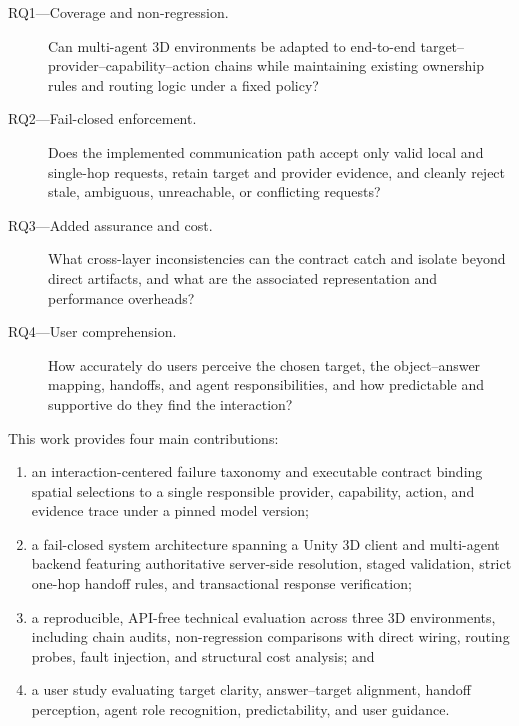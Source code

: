 \begin{description}
\item[RQ1---Coverage and non-regression.] Can multi-agent 3D environments
be adapted to end-to-end target--provider--capability--action chains while
maintaining existing ownership rules and routing logic under a fixed policy?

\item[RQ2---Fail-closed enforcement.] Does the implemented communication path
accept only valid local and single-hop requests, retain target and provider
evidence, and cleanly reject stale, ambiguous, unreachable, or conflicting
requests?

\item[RQ3---Added assurance and cost.] What cross-layer inconsistencies
can the contract catch and isolate beyond direct artifacts, and what are the
associated representation and performance overheads?

\item[RQ4---User comprehension.] How accurately do users perceive the chosen
target, the object--answer mapping, handoffs, and agent responsibilities, and
how predictable and supportive do they find the interaction?
\end{description}

This work provides four main contributions:

\begin{enumerate}
\item an interaction-centered failure taxonomy and executable contract binding
spatial selections to a single responsible provider, capability, action, and
evidence trace under a pinned model version;

\item a fail-closed system architecture spanning a Unity 3D client and
multi-agent backend featuring authoritative server-side resolution, staged
validation, strict one-hop handoff rules, and transactional response
verification;

\item a reproducible, API-free technical evaluation across three 3D
environments, including chain audits, non-regression comparisons with direct
wiring, routing probes, fault injection, and structural cost analysis; and

\item a user study evaluating target clarity, answer--target alignment,
handoff perception, agent role recognition, predictability, and user guidance.
\end{enumerate}

